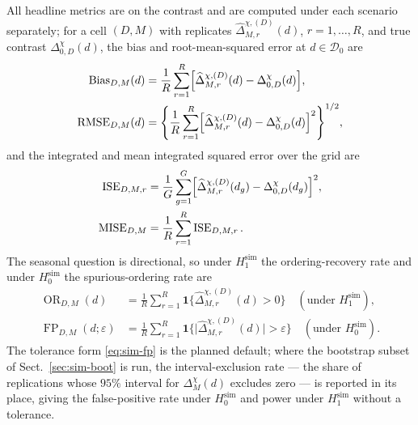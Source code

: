 All headline metrics are on the contrast and are computed under each scenario separately; for a cell \((D,M)\) with replicates \(\widehat\Delta_{M,r}^{\chi,(D)}(d)\), \(r=1,\dots,R\), and true contrast \(\Delta_{0,D}^{\chi}(d)\), the bias and root-mean-squared error at \(d\in\mathcal D_0\) are
\begin{align}
  \operatorname{Bias}_{D,M}(d)
   & =\frac1R\sum_{r=1}^R\Bigl[\widehat\Delta_{M,r}^{\chi,(D)}(d)-\Delta_{0,D}^{\chi}(d)\Bigr],
  \label{eq:sim-bias}                                                                                                   \\
  \operatorname{RMSE}_{D,M}(d)
   & =\Biggl\{\frac1R\sum_{r=1}^R\Bigl[\widehat\Delta_{M,r}^{\chi,(D)}(d)-\Delta_{0,D}^{\chi}(d)\Bigr]^2\Biggr\}^{1/2},
  \label{eq:sim-rmse}
\end{align}
and the integrated and mean integrated squared error over the grid are
\begin{align}
  \operatorname{ISE}_{D,M,r}
   & =\frac1G\sum_{g=1}^G\Bigl[\widehat\Delta_{M,r}^{\chi,(D)}(d_g)-\Delta_{0,D}^{\chi}(d_g)\Bigr]^2,
  \label{eq:sim-ise}                                                                                  \\
  \operatorname{MISE}_{D,M}
   & =\frac1R\sum_{r=1}^R\operatorname{ISE}_{D,M,r}.
  \label{eq:sim-mise}
\end{align}
The seasonal question is directional, so under \(H_1^{\mathrm{sim}}\) the ordering-recovery rate and under \(H_0^{\mathrm{sim}}\) the spurious-ordering rate are
\begin{align}
  \operatorname{OR}_{D,M}(d)
   & =\frac1R\sum_{r=1}^R\mathbf 1\bigl\{\widehat\Delta_{M,r}^{\chi,(D)}(d)>0\bigr\}
  \quad(\text{under } H_1^{\mathrm{sim}}),
  \label{eq:sim-or}                                                                                        \\
  \operatorname{FP}_{D,M}(d;\varepsilon)
   & =\frac1R\sum_{r=1}^R\mathbf 1\bigl\{\lvert\widehat\Delta_{M,r}^{\chi,(D)}(d)\rvert>\varepsilon\bigr\}
  \quad(\text{under } H_0^{\mathrm{sim}}).
  \label{eq:sim-fp}
\end{align}
The tolerance form \eqref{eq:sim-fp} is the planned default; where the bootstrap subset of Sect.~\ref{sec:sim-boot} is run, the interval-exclusion rate --- the share of replications whose \(95\%\) interval for \(\Delta_M^{\chi}(d)\) excludes zero --- is reported in its place, giving the false-positive rate under \(H_0^{\mathrm{sim}}\) and power under \(H_1^{\mathrm{sim}}\) without a tolerance.
